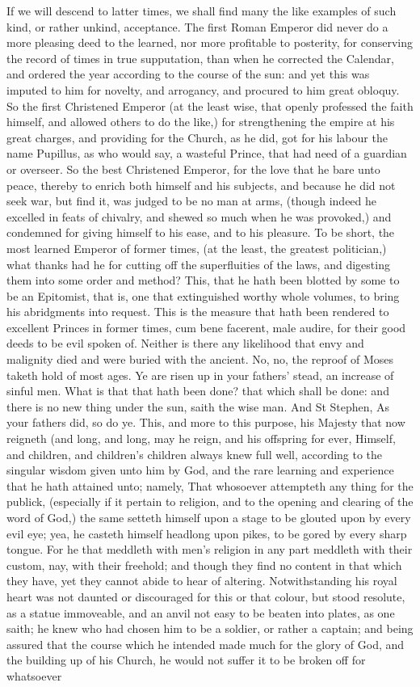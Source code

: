 If we will descend to latter times, we shall find many the like examples of such kind, or rather unkind, acceptance. The first Roman Emperor did never do a more pleasing deed to the learned, nor more profitable to posterity, for conserving the record of times in true supputation, than when he corrected the Calendar, and ordered the year according to the course of the sun: and yet this was imputed to him for novelty, and arrogancy, and procured to him great obloquy. So the first Christened Emperor (at the least wise, that openly professed the faith himself, and allowed others to do the like,) for strengthening the empire at his great charges, and providing for the Church, as he did, got for his labour the name Pupillus, as who would say, a wasteful Prince, that had need of a guardian or overseer. So the best Christened Emperor, for the love that he bare unto peace, thereby to enrich both himself and his subjects, and because he did not seek war, but find it, was judged to be no man at arms, (though indeed he excelled in feats of chivalry, and shewed so much when he was provoked,) and condemned for giving himself to his ease, and to his pleasure. To be short, the most learned Emperor of former times, (at the least, the greatest politician,) what thanks had he for cutting off the superfluities of the laws, and digesting them into some order and method? This, that he hath been blotted by some to be an Epitomist, that is, one that extinguished worthy whole volumes, to bring his abridgments into request. This is the measure that hath been rendered to excellent Princes in former times, cum bene facerent, male audire, for their good deeds to be evil spoken of. Neither is there any likelihood that envy and malignity died and were buried with the ancient. No, no, the reproof of Moses taketh hold of most ages. Ye are risen up in your fathers' stead, an increase of sinful men. What is that that hath been done? that which shall be done: and there is no new thing under the sun, saith the wise man. And St Stephen, As your fathers did, so do ye. This, and more to this purpose, his Majesty that now reigneth (and long, and long, may he reign, and his offspring for ever, Himself, and children, and children's children always\) knew full well, according to the singular wisdom given unto him by God, and the rare learning and experience that he hath attained unto; namely, That whosoever attempteth any thing for the publick, (especially if it pertain to religion, and to the opening and clearing of the word of God,) the same setteth himself upon a stage to be glouted upon by every evil eye; yea, he casteth himself headlong upon pikes, to be gored by every sharp tongue. For he that meddleth with men's religion in any part meddleth with their custom, nay, with their freehold; and though they find no content in that which they have, yet they cannot abide to hear of altering. Notwithstanding his royal heart was not daunted or discouraged for this or that colour, but stood resolute, as a statue immoveable, and an anvil not easy to be beaten into plates, as one saith; he knew who had chosen him to be a soldier, or rather a captain; and being assured that the course which he intended made much for the glory of God, and the building up of his Church, he would not suffer it to be broken off for whatsoever 